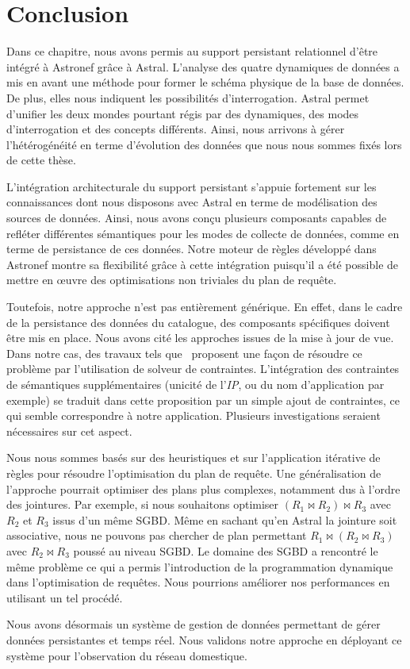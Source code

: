 \section{Conclusion}\label{sec:contrib:asteroid:conclusion}
Dans ce chapitre, nous avons permis au support persistant relationnel d'être intégré à Astronef grâce à Astral. L'analyse des quatre dynamiques de données a mis en avant une méthode pour former le schéma physique de la base de données. De plus, elles nous indiquent les possibilités d'interrogation. Astral permet d'unifier les deux mondes pourtant régis par des dynamiques, des modes d'interrogation et des concepts différents. Ainsi, nous arrivons à gérer l'hétérogénéité en terme d'évolution des données que nous nous sommes fixés lors de cette thèse.

L'intégration architecturale du support persistant s'appuie fortement sur les connaissances dont nous disposons avec Astral en terme de modélisation des sources de données. Ainsi, nous avons conçu plusieurs composants capables de refléter différentes sémantiques pour les modes de collecte de données, comme en terme de persistance de ces données. Notre moteur de règles développé dans Astronef montre sa flexibilité grâce à cette intégration puisqu'il a été possible de mettre en œuvre des optimisations non triviales du plan de requête.

Toutefois, notre approche n'est pas entièrement générique. En effet, dans le cadre de la persistance des données du catalogue, des composants spécifiques doivent être mis en place. Nous avons cité les approches issues de la mise à jour de vue. Dans notre cas, des travaux tels que~\cite{Shu:viewupdate} proposent une façon de résoudre ce problème par l'utilisation de solveur de contraintes. L'intégration des contraintes de sémantiques supplémentaires (unicité de l'\textit{IP}, ou du nom d'application par exemple) se traduit dans cette proposition par un simple ajout de contraintes, ce qui semble correspondre à notre application. Plusieurs investigations seraient nécessaires sur cet aspect.

Nous nous sommes basés sur des heuristiques et sur l'application itérative de règles pour résoudre l'optimisation du plan de requête. Une généralisation de l'approche pourrait optimiser des plans plus complexes, notamment dus à l'ordre des jointures. Par exemple, si nous souhaitons optimiser $(R_1 \Join R_2) \Join R_3$ avec $R_2$ et $R_3$ issus d'un même SGBD. Même en sachant qu'en Astral la jointure soit associative, nous ne pouvons pas chercher de plan permettant $R_1 \Join (R_2 \Join R_3)$ avec $R_2\Join R_3$ poussé au niveau SGBD. Le domaine des SGBD a rencontré le même problème ce qui a permis l'introduction de la programmation dynamique dans l'optimisation de requêtes. Nous pourrions améliorer nos performances en utilisant un tel procédé.

Nous avons désormais un système de gestion de données permettant de gérer données persistantes et temps réel. Nous validons notre approche en déployant ce système pour l'observation du réseau domestique.
